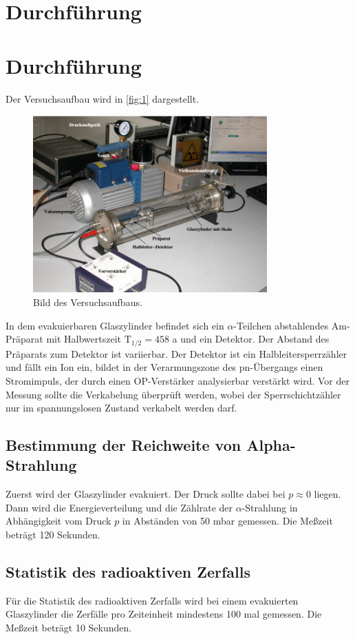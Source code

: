 \section{Durchführung}
\label{sec:Durchführung}

\section{Durchführung}
Der Versuchsaufbau wird in \autoref{fig:1} dargestellt.
\begin{figure}[H]
  \centering
  \includegraphics[width=9cm]{content/aufbau}
  \caption{Bild des Versuchsaufbaus.}
  \label{fig:1}
\end{figure} 
In dem evakuierbaren Glaszylinder befindet sich ein $\alpha$-Teilchen abstahlendes Am-Präparat mit Halbwertszeit $\textrm{T}_{1/2}=458$ a und ein Detektor. Der Abstand des Präparats zum Detektor ist variierbar. Der Detektor ist ein Halbleitersperrzähler und fällt ein Ion ein, bildet in der Verarmungszone des pn-Übergangs einen Stromimpuls, der durch einen OP-Verstärker analysierbar verstärkt wird. Vor der Messung sollte die Verkabelung überprüft werden, wobei der Sperrschichtzähler nur im spannungslosen Zustand verkabelt werden darf.

\subsection{Bestimmung der Reichweite von Alpha-Strahlung}
Zuerst wird der Glaszylinder evakuiert. Der Druck sollte dabei bei $p\approx 0$ liegen. Dann wird die Energieverteilung und die Zählrate der $\alpha$-Strahlung in Abhängigkeit vom Druck $p$ in Abständen von 50 mbar gemessen. Die Meßzeit beträgt 120 Sekunden. 

\subsection{Statistik des radioaktiven Zerfalls}
Für die Statistik des radioaktiven Zerfalls wird bei einem evakuierten Glaszylinder die Zerfälle pro Zeiteinheit mindestens 100 mal gemessen. Die Meßzeit beträgt 10 Sekunden. 
